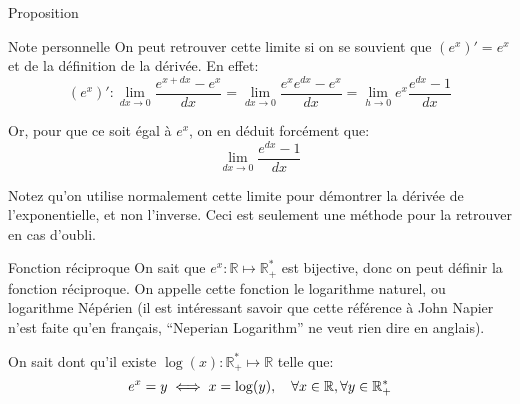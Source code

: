 \documentclass[a4paper]{article}
\begin{document}
\begin{parag}{Proposition}
    \begin{subparag}{Note personnelle}
        On peut retrouver cette limite si on se souvient que $\left(e^x\right)' = e^x$ et de la définition de la dérivée. En effet: 
        \[\left(e^x\right)' : \lim_{dx \to 0} \frac{e^{x+dx} - e^x}{dx} = \lim_{dx \to 0} \frac{e^x e^{dx} - e^x}{dx} = \lim_{h \to 0} e^x\frac{e^{dx} - 1}{dx}\]

        Or, pour que ce soit égal à $e^x$, on en déduit forcément que: 
        \[\lim_{dx \to 0} \frac{e^{dx} - 1}{dx}\]
        
        Notez qu'on utilise normalement cette limite pour démontrer la dérivée de l'exponentielle, et non l'inverse. Ceci est seulement une méthode pour la retrouver en cas d'oubli.
    \end{subparag}
    
\end{parag}

\begin{parag}{Fonction réciproque}
    On sait que $e^{x} : \mathbb{R} \mapsto \mathbb{R}^*_+$ est bijective, donc on peut définir la fonction réciproque. On appelle cette fonction le logarithme naturel, ou logarithme Népérien (il est intéressant savoir que cette référence à John Napier n'est faite qu'en français, ``Neperian Logarithm'' ne veut rien dire en anglais).

    On sait dont qu'il existe $\log\left(x\right) : \mathbb{R}^*_+ \mapsto \mathbb{R}$ telle que: 
    \[e^x = y \iff x = \log\left(y\right), \mathspace \forall x \in \mathbb{R}, \forall y \in \mathbb{R}^*_+\]
\end{parag}
\end{document}
